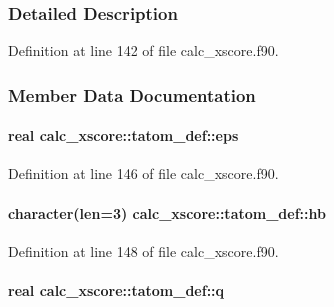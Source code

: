 \subsubsection{Detailed Description}


Definition at line 142 of file calc\-\_\-xscore.\-f90.



\subsubsection{Member Data Documentation}
\hypertarget{structcalc__xscore_1_1tatom__def_a375a7c99f30092128aad0567e78414b3}{
\paragraph[{eps}]{\setlength{\rightskip}{0pt plus 5cm}real calc\-\_\-xscore\-::tatom\-\_\-def\-::eps}}\label{structcalc__xscore_1_1tatom__def_a375a7c99f30092128aad0567e78414b3}


Definition at line 146 of file calc\-\_\-xscore.\-f90.

\hypertarget{structcalc__xscore_1_1tatom__def_a08504825528df2912146c9396944613f}{
\paragraph[{hb}]{\setlength{\rightskip}{0pt plus 5cm}character(len=3) calc\-\_\-xscore\-::tatom\-\_\-def\-::hb}}\label{structcalc__xscore_1_1tatom__def_a08504825528df2912146c9396944613f}


Definition at line 148 of file calc\-\_\-xscore.\-f90.

\hypertarget{structcalc__xscore_1_1tatom__def_a8bdfd3934fe19732b05d708b333edb7c}{
\paragraph[{q}]{\setlength{\rightskip}{0pt plus 5cm}real calc\-\_\-xscore\-::tatom\-\_\-def\-::q}}\label{structcalc__xscore_1_1tatom__def_a8bdfd3934fe19732b05d708b333edb7c}


